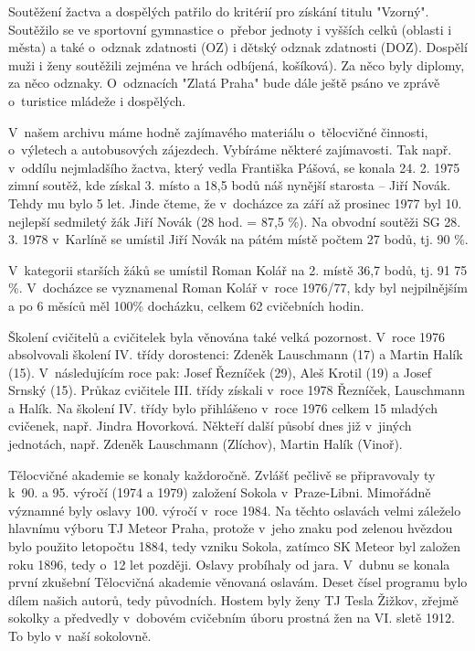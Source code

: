 \documentclass[a5paper, 11pt, twoside]{article}
\begin{document}
Soutěžení žactva a dospělých patřilo do kritérií pro získání titulu
"Vzorný". Soutěžilo se ve sportovní gymnastice o~přebor jednoty i
vyšších celků (oblasti i města) a také o~odznak zdatnosti (OZ) i dětský
odznak zdatnosti (DOZ). Dospělí muži i ženy soutěžili zejména ve hrách
odbíjená, košíková). Za něco byly diplomy, za něco odznaky. O~odznacích
"Zlatá Praha" bude dále ještě psáno ve zprávě o~turistice mládeže i
dospělých.

V~našem archivu máme hodně zajímavého materiálu o~tělocvičné činnosti,
o~výletech a autobusových zájezdech. Vybíráme některé zajímavosti. Tak
např. v~oddílu nejmladšího žactva, který vedla Františka Pášová, se
konala 24. 2. 1975 zimní soutěž, kde získal 3. místo a 18,5 bodů náš
nynější starosta -- Jiří Novák. Tehdy mu bylo 5 let. Jinde čteme, že
v~docházce za září až prosinec 1977 byl 10. nejlepší sedmiletý žák Jiří
Novák (28 hod. = 87,5 \%). Na obvodní soutěži SG 28. 3. 1978 v~Karlíně
se umístil Jiří Novák na pátém místě počtem 27 bodů, tj. 90 \%.

V~kategorii starších žáků se umístil Roman Kolář na 2. místě 36,7 bodů,
tj. 91 75 \%. V~docházce se vyznamenal Roman Kolář v~roce 1976/77, kdy
byl nejpilnějším a po 6 měsíců měl 100\% docházku, celkem 62 cvičebních
hodin.

Školení cvičitelů a cvičitelek byla věnována také velká pozornost.
V~roce 1976 absolvovali školení IV. třídy dorostenci: Zdeněk Lauschmann
(17) a Martin Halík (15). V~následujícím roce pak: Josef Řezníček (29),
Aleš Krotil (19) a Josef Srnský (15). Průkaz cvičitele III. třídy
získali v~roce 1978 Řezníček, Lauschmann a Halík. Na školení IV. třídy
bylo přihlášeno v~roce 1976 celkem 15 mladých cvičenek, např. Jindra
Hovorková. Někteří další působí dnes již v~jiných jednotách, např.
Zdeněk Lauschmann (Zlíchov), Martin Halík (Vinoř).

Tělocvičné akademie se konaly každoročně. Zvlášť pečlivě se připravovaly
ty k~90. a 95. výročí (1974 a 1979) založení Sokola v~Praze-Libni.
Mimořádně významné byly oslavy 100. výročí v~roce 1984. Na těchto
oslavách velmi záleželo hlavnímu výboru TJ Meteor Praha, protože v~jeho
znaku pod zelenou hvězdou bylo použito letopočtu 1884, tedy vzniku
Sokola, zatímco SK Meteor byl založen roku 1896, tedy o~12 let později.
Oslavy probíhaly od jara. V~dubnu se konala první zkušební Tělocvičná
akademie věnovaná oslavám. Deset čísel programu bylo dílem našich
autorů, tedy původních. Hostem byly ženy TJ Tesla Žižkov, zřejmě sokolky
a předvedly v~dobovém cvičebním úboru prostná žen na VI. sletě 1912. To
bylo v~naší sokolovně.
\end{document}
